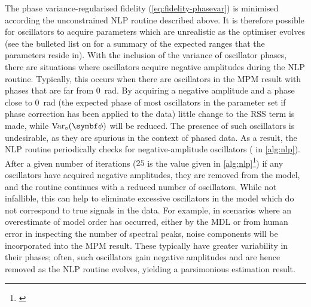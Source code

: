 The phase variance-regularised fidelity (\cref{eq:fidelity-phasevar}) is
minimised according the unconstrained \ac{NLP} routine described above. It is
therefore possible for oscillators to acquire parameters which are unrealistic
as the optimiser evolves (see the bulleted list on
 for a summary of
the expected ranges that the parameters reside in). With the inclusion of
the variance of oscillator phases, there are situations where oscillators
acquire negative amplitudes during the \ac{NLP} routine. Typically, this occurs
when there are oscillators in the \ac{MPM} result with phases
that are far from \qty{0}{\radian}. By acquiring a negative amplitude and a
phase close to
\qty{0}{\radian} (the expected phase of most oscillators in the parameter set
if phase correction has been applied to the data)
little change to the \ac{RSS} term is made, while
$\circvar$ will be reduced. The presence of such oscillators is
undesirable, as they are spurious in the context of phased data. As a
result, the \ac{NLP} routine periodically checks for negative-amplitude oscillators
( in \cref{alg:nlp}). After a
given number of iterations ($25$ is the value given in \cref{alg:nlp}\footnote{
    \label{fn:neg-amps-25}
})
if any oscillators have acquired negative
amplitudes, they are removed from the model, and the routine continues with a
reduced number of oscillators. While not infallible, this can help to
eliminate excessive oscillators in the
model which do not correspond to true signals in the data. For example, in
scenarios where an overestimate of model order has occurred, either by the
\ac{MDL} or from human error in inspecting the number of spectral peaks, noise
components will be incorporated into the \ac{MPM} result. These typically have
greater variability in their phases; often, such oscillators gain negative
amplitudes and are hence removed as the \ac{NLP} routine evolves, yielding a
parsimonious estimation result.
